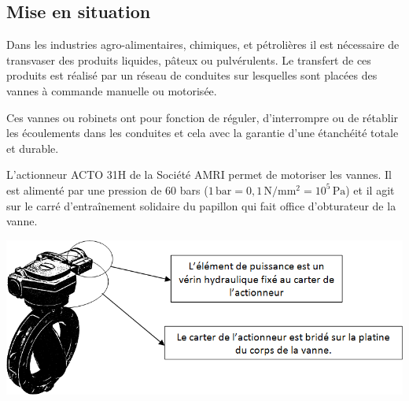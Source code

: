 \documentclass[10pt,fleqn]{article} %
\begin{document}

\vspace{7cm}
\pagestyle{fancy}
\thispagestyle{plain}


\def\columnseprulecolor{\color{ocre}}
\setlength{\columnseprule}{0.4pt} 

\ifprof
\begin{center}
\end{center}

\else
\begin{multicols}{2}
\subsection*{Mise en situation}
Dans les industries agro-alimentaires, chimiques, et pétrolières il est nécessaire de transvaser des produits liquides, pâteux ou pulvérulents.  Le transfert de ces produits est réalisé par un réseau de conduites sur lesquelles sont placées des vannes à commande manuelle ou motorisée.

Ces vannes ou robinets ont pour fonction de réguler, d'interrompre ou de rétablir les écoulements dans les conduites et cela avec la garantie d'une étanchéité totale et durable.


L’actionneur ACTO 31H de la Société AMRI permet de motoriser les vannes. Il est alimenté par une pression de  60 bars ($1\,\text{bar} = 0,1\,\text{N}/\text{mm}^2 = 10^5\,\text{Pa}$) et il agit sur le carré d'entraînement solidaire du papillon qui fait office d'obturateur de la vanne. 


\begin{center}
\includegraphics[width=\linewidth]{images/fig_02}
\end{center}


\end{multicols}
\end{document}
